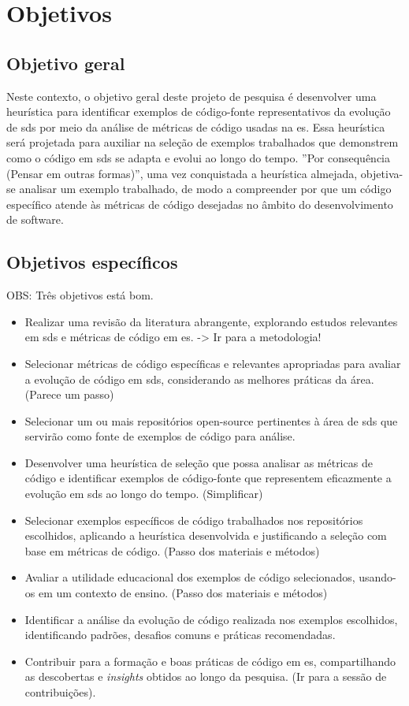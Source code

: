 \section{Objetivos}\label{sec:objetivos}
\subsection{Objetivo geral}\label{subsec:objetivoGeral}
 Neste contexto, o objetivo geral deste projeto de pesquisa é desenvolver uma heurística para identificar exemplos de código-fonte representativos da evolução de \gls{sds} por meio da análise de métricas de código usadas na \gls{es}. Essa heurística será projetada para auxiliar na seleção de exemplos trabalhados que demonstrem como o código em \gls{sds} se adapta e evolui ao longo do tempo. ''Por consequência (Pensar em outras formas)'', uma vez conquistada a heurística almejada, objetiva-se analisar um exemplo trabalhado, de modo a compreender por que um código específico atende às métricas de código desejadas no âmbito do desenvolvimento de software.

\subsection{Objetivos específicos}\label{subsec:objetivosEspecificos}
OBS: Três objetivos está bom.
\begin{itemize}
    \item Realizar uma revisão da literatura abrangente, explorando estudos relevantes em \gls{sds} e métricas de código em \gls{es}. -> Ir para a metodologia!
    \item Selecionar métricas de código específicas e relevantes apropriadas para avaliar a evolução de código em \gls{sds}, considerando as melhores práticas da área. (Parece um passo)
    \item Selecionar um ou mais repositórios open-source pertinentes à área de \gls{sds} que servirão como fonte de exemplos de código para análise.
    \item Desenvolver uma heurística de seleção que possa analisar as métricas de código e identificar exemplos de código-fonte que representem eficazmente a evolução em \gls{sds} ao longo do tempo. (Simplificar)
    \item Selecionar exemplos específicos de código trabalhados nos repositórios escolhidos, aplicando a heurística desenvolvida e justificando a seleção com base em métricas de código. (Passo dos materiais e métodos)
    \item Avaliar a utilidade educacional dos exemplos de código selecionados, usando-os em um contexto de ensino. (Passo dos materiais e métodos)
    \item Identificar a análise da evolução de código realizada nos exemplos escolhidos, identificando padrões, desafios comuns e práticas recomendadas.
    \item Contribuir para a formação e boas práticas de código em \gls{es}, compartilhando as descobertas e \textit{insights} obtidos ao longo da pesquisa. (Ir para a sessão de contribuições).
\end{itemize}

